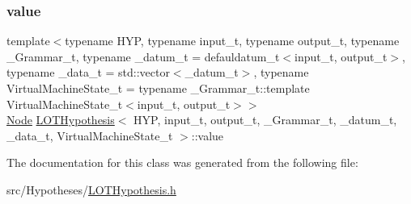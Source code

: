 \mbox{\label{class_l_o_t_hypothesis_ac759b3eab77ead1749b905a3dde74961}} 
\subsubsection{\texorpdfstring{value}{value}}
{\footnotesize\ttfamily template$<$typename H\+YP, typename input\+\_\+t, typename output\+\_\+t, typename \+\_\+\+Grammar\+\_\+t, typename \+\_\+datum\+\_\+t = defauldatum\+\_\+t$<$input\+\_\+t, output\+\_\+t$>$, typename \+\_\+data\+\_\+t = std\+::vector$<$\+\_\+datum\+\_\+t$>$, typename Virtual\+Machine\+State\+\_\+t = typename \+\_\+\+Grammar\+\_\+t\+::template Virtual\+Machine\+State\+\_\+t$<$input\+\_\+t, output\+\_\+t$>$$>$ \\
\hyperlink{class_node}{Node} \hyperlink{class_l_o_t_hypothesis}{L\+O\+T\+Hypothesis}$<$ H\+YP, input\+\_\+t, output\+\_\+t, \+\_\+\+Grammar\+\_\+t, \+\_\+datum\+\_\+t, \+\_\+data\+\_\+t, Virtual\+Machine\+State\+\_\+t $>$\+::value\hspace{0.3cm}{\ttfamily [protected]}}



The documentation for this class was generated from the following file\+:\begin{DoxyCompactItemize}
\item 
src/\+Hypotheses/\hyperlink{_l_o_t_hypothesis_8h}{L\+O\+T\+Hypothesis.\+h}\end{DoxyCompactItemize}

